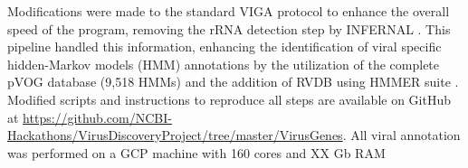\documentclass[genes, moreauthors]{Definitions/mdpi}
\begin{document}
  Modifications were made to the standard VIGA \cite{Gonzalez-Tortuero2018}
  protocol to enhance the overall speed of the program, removing the rRNA
  detection step by INFERNAL \cite{Nawrocki2013}. This pipeline handled this
  information, enhancing the identification of viral specific hidden-Markov
  models (HMM) annotations by the utilization of the complete pVOG database
  \cite{Grazziotin2017} (9,518 HMMs) and the addition of RVDB
  \cite{Goodacre2018} using HMMER suite \cite{hmmer}. Modified scripts and
  instructions to reproduce all steps are available on GitHub at
  \url{https://github.com/NCBI-Hackathons/VirusDiscoveryProject/tree/master/VirusGenes}.
  All viral annotation was performed on a GCP machine with 160 cores and XX Gb
  RAM





\end{document}
